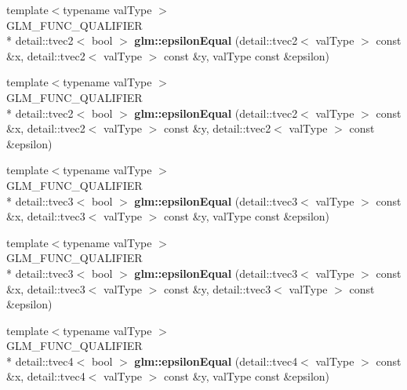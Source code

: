 \begin{DoxyCompactItemize}
\item 
\hypertarget{namespaceglm_a4a3e2eea11263ad308ccb17a0cc53a67}{{\footnotesize template$<$typename val\-Type $>$ }\\G\-L\-M\-\_\-\-F\-U\-N\-C\-\_\-\-Q\-U\-A\-L\-I\-F\-I\-E\-R \\*
detail\-::tvec2$<$ bool $>$ {\bfseries glm\-::epsilon\-Equal} (detail\-::tvec2$<$ val\-Type $>$ const \&x, detail\-::tvec2$<$ val\-Type $>$ const \&y, val\-Type const \&epsilon)}\label{namespaceglm_a4a3e2eea11263ad308ccb17a0cc53a67}

\item 
\hypertarget{namespaceglm_a27de46979269a3aa50277e362522e064}{{\footnotesize template$<$typename val\-Type $>$ }\\G\-L\-M\-\_\-\-F\-U\-N\-C\-\_\-\-Q\-U\-A\-L\-I\-F\-I\-E\-R \\*
detail\-::tvec2$<$ bool $>$ {\bfseries glm\-::epsilon\-Equal} (detail\-::tvec2$<$ val\-Type $>$ const \&x, detail\-::tvec2$<$ val\-Type $>$ const \&y, detail\-::tvec2$<$ val\-Type $>$ const \&epsilon)}\label{namespaceglm_a27de46979269a3aa50277e362522e064}

\item 
\hypertarget{namespaceglm_aa846c072e75cbec839b1b1ffbf098508}{{\footnotesize template$<$typename val\-Type $>$ }\\G\-L\-M\-\_\-\-F\-U\-N\-C\-\_\-\-Q\-U\-A\-L\-I\-F\-I\-E\-R \\*
detail\-::tvec3$<$ bool $>$ {\bfseries glm\-::epsilon\-Equal} (detail\-::tvec3$<$ val\-Type $>$ const \&x, detail\-::tvec3$<$ val\-Type $>$ const \&y, val\-Type const \&epsilon)}\label{namespaceglm_aa846c072e75cbec839b1b1ffbf098508}

\item 
\hypertarget{namespaceglm_a2323f3eadd280b05f8f2e37aad9cdb83}{{\footnotesize template$<$typename val\-Type $>$ }\\G\-L\-M\-\_\-\-F\-U\-N\-C\-\_\-\-Q\-U\-A\-L\-I\-F\-I\-E\-R \\*
detail\-::tvec3$<$ bool $>$ {\bfseries glm\-::epsilon\-Equal} (detail\-::tvec3$<$ val\-Type $>$ const \&x, detail\-::tvec3$<$ val\-Type $>$ const \&y, detail\-::tvec3$<$ val\-Type $>$ const \&epsilon)}\label{namespaceglm_a2323f3eadd280b05f8f2e37aad9cdb83}

\item 
\hypertarget{namespaceglm_ae90639fa7003f447e9a4ff40e6f3961d}{{\footnotesize template$<$typename val\-Type $>$ }\\G\-L\-M\-\_\-\-F\-U\-N\-C\-\_\-\-Q\-U\-A\-L\-I\-F\-I\-E\-R \\*
detail\-::tvec4$<$ bool $>$ {\bfseries glm\-::epsilon\-Equal} (detail\-::tvec4$<$ val\-Type $>$ const \&x, detail\-::tvec4$<$ val\-Type $>$ const \&y, val\-Type const \&epsilon)}\label{namespaceglm_ae90639fa7003f447e9a4ff40e6f3961d}


\end{DoxyCompactItemize}

